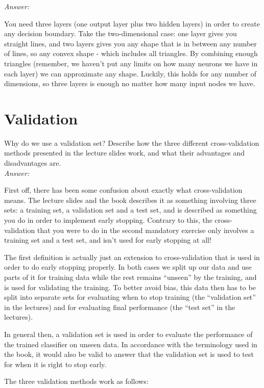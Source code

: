 \noindent\textit{Answer:}

\noindent
You need three layers (one output layer plus two hidden layers) in order to create any decision boundary.
Take the two-dimensional case: one layer gives you straight lines, and two layers gives you any shape that is in between any number of lines, so any convex shape - which includes all triangles.
By combining enough triangles (remember, we haven’t put any limits on how many neurons we have in each layer) we can approximate any shape.
Luckily, this holds for any number of dimensions, so three layers is enough no matter how many input nodes we have.

\section{Validation}
Why do we use a validation set?
Describe how the three different cross-validation methods presented in the lecture slides work, and what their advantages and disadvantages are.\\

\noindent\textit{Answer:}

\noindent
First off, there has been some confusion about exactly what cross-validation means.
The lecture slides and the book describes it as something involving three sets: a training set, a validation set and a test set, and is described as something you do in order to implement early stopping.
Contrary to this, the cross-validation that you were to do in the second mandatory exercise only involves a training set and a test set, and isn’t used for early stopping at all!

The first definition is actually just an extension to cross-validation that is used in order to do early stopping properly.
In both cases we split up our data and use parts of it for training data while the rest remains “unseen” by the training, and is used for validating the training.
To better avoid bias, this data then has to be split into separate sets for evaluating when to stop training (the “validation set” in the lectures) and for evaluating final performance (the “test set” in the lectures).

In general then, a validation set is used in order to evaluate the performance of
the trained classifier on unseen data.
In accordance with the terminology used in
the book, it would also be valid to answer that the validation set is used to test for
when it is right to stop early.

The three validation methods work as follows:

